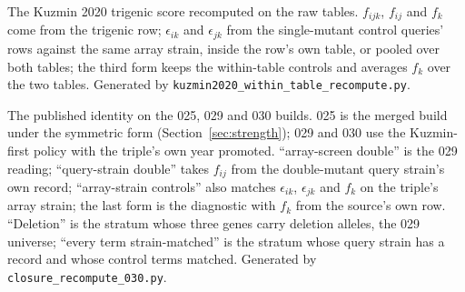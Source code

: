 \begin{table}[htbp]
\centering
\footnotesize
\caption{The Kuzmin 2020 trigenic score recomputed on the raw tables. $f_{ijk}$, $f_{ij}$
and $f_k$ come from the trigenic row; $\epsilon_{ik}$ and $\epsilon_{jk}$ from the
single-mutant control queries' rows against the same array strain, inside the row's own
table, or pooled over both tables; the third form keeps the within-table controls and
averages $f_k$ over the two tables. Generated by
\texttt{kuzmin2020\_within\_table\_recompute.py}.}
\label{tab:within-table}

\end{table}

\begin{table}[htbp]
\centering
\footnotesize
\caption{The published identity on the 025, 029 and 030 builds. 025 is the merged
build under the symmetric form (Section~\ref{sec:strength}); 029 and 030 use the
Kuzmin-first policy with the triple's own year promoted. ``array-screen double'' is the
029 reading; ``query-strain double'' takes $f_{ij}$ from the double-mutant query
strain's own record; ``array-strain controls'' also matches $\epsilon_{ik}$,
$\epsilon_{jk}$ and $f_k$ on the triple's array strain; the last form is the diagnostic
with $f_k$ from the source's own row. ``Deletion'' is the stratum whose three genes carry
deletion alleles, the 029 universe; ``every term strain-matched'' is the stratum whose
query strain has a record and whose control terms matched. Generated by
\texttt{closure\_recompute\_030.py}.}
\label{tab:multi-measurement}

\end{table}
